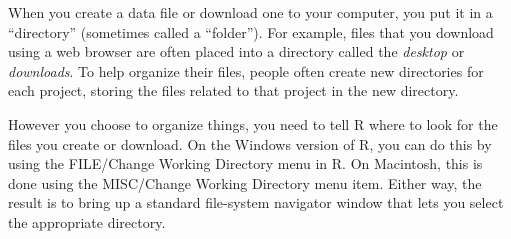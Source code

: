 When you create a data file or download one to your computer, you put
it in a ``directory'' (sometimes called a ``folder'').  For example,
files that you download using a web browser are often placed into a
directory called the {\em desktop} or {\em downloads}.  To help
organize their files, people often create new directories for each
project, storing the files related to that project in the new
directory.

However you choose to organize things, you need to tell R where to
look for the files you create or download.  On the Windows version of
R, you can do this by using the {\sc FILE/Change Working Directory}
menu in R.  On Macintosh, this is done using the {\sc MISC/Change
  Working Directory} menu item.  Either way, the result is to bring up
a standard file-system navigator window that lets you select the
appropriate directory.

